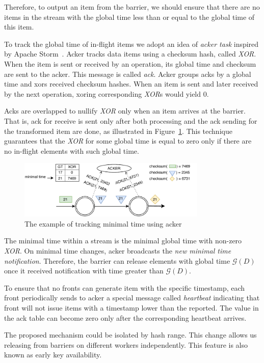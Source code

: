 Therefore, to output an item from the barrier, we should ensure that there are no items in the stream with the global time less than or equal to the global time of this item.

To track the global time of in-flight items we adopt an idea of {\it acker task} inspired by Apache Storm~\cite{apache:storm}. Acker tracks data items using a checksum hash, called {\it XOR}. When the item is sent or received by an operation, its global time and checksum are sent to the acker. This message is called {\it ack}.
 Acker groups acks by a global time and xors received checksum hashes. 
When an item is sent and later received by the next operation, xoring corresponding {\it XOR}s would yield 0.

Acks are overlapped to nullify {\it XOR} only when an item arrives at the barrier. That is, ack for receive is sent only after both processing and the ack sending for the transformed item are done, as illustrated in Figure~\ref{acker}. This technique guarantees that the {\it XOR} for some global time is equal to zero only if there are no in-flight elements with such global time.

\begin{figure}[ht]
  \centering
  \includegraphics[width=0.8\textwidth]{pics/acker}
  \caption{The example of tracking minimal time using acker}
  \label {acker}
\end{figure}

The minimal time within a stream is the minimal global time with non-zero {\it XOR}. On minimal time changes, acker broadcasts the {\it new minimal time notification}. 
Therefore, the barrier can release elements with global time $\mathcal{G} (D)$ 
once it received notification with time greater than $\mathcal{G} (D)$.

To ensure that no fronts can generate item with the specific timestamp, each front periodically sends to acker a special message called {\it heartbeat} indicating that front will not issue items with a timestamp lower than the reported. The value in the ack table can become zero only after the corresponding heartbeat arrives.

The proposed mechanism could be isolated by hash range. This change allows us releasing from barriers on different workers independently. This feature is also known as early key availability.

